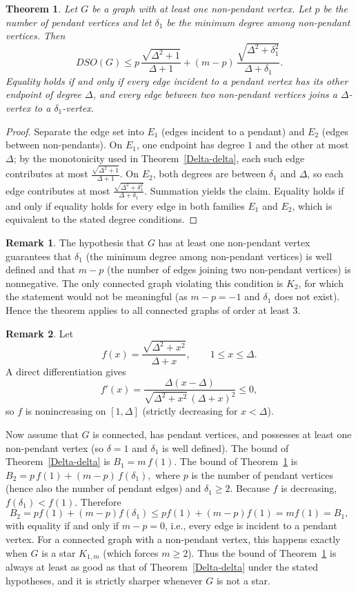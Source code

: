 \documentclass{article}
\newtheorem{theorem}{Theorem}
\theoremstyle{definition}
\newtheorem{remark}{Remark}
\begin{document}
\begin{theorem}\label{new:pendant}
Let $G$ be a graph with at least one non-pendant vertex.
Let $p$ be the number of pendant vertices and let $\delta_1$ be the minimum degree among non-pendant vertices.
Then
\[
DSO(G) \le p\,\frac{\sqrt{\Delta^2+1}}{\Delta+1}
+ (m-p)\,\frac{\sqrt{\Delta^2+\delta_1^2}}{\Delta+\delta_1}.
\]
Equality holds if and only if every edge incident to a pendant vertex has its other endpoint of degree $\Delta$, and every edge between two non-pendant vertices joins a $\Delta$-vertex to a $\delta_1$-vertex.
\end{theorem}
\begin{proof}
Separate the edge set into $E_1$ (edges incident to a pendant) and $E_2$ (edges between non-pendants). On $E_1$, one endpoint has degree $1$ and the other at most $\Delta$; by the monotonicity used in Theorem~\ref{Delta-delta}, each such edge contributes at most $\frac{\sqrt{\Delta^2+1}}{\Delta+1}$. On $E_2$, both degrees are between $\delta_1$ and $\Delta$, so each edge contributes at most $\frac{\sqrt{\Delta^2+\delta_1^2}}{\Delta+\delta_1}$. Summation yields the claim. 
Equality holds if and only if equality holds for every edge in both
families $E_1$ and $E_2$, which is equivalent to the stated degree
conditions.
\end{proof}
\begin{remark}
The hypothesis that $G$ has at least one non-pendant vertex guarantees that $\delta_1$ (the minimum degree among non-pendant vertices) is well defined and that $m-p$ (the number of edges joining two non-pendant vertices) is nonnegative.
The only connected graph violating this condition is $K_2$, for which the statement would not be meaningful (as $m-p=-1$ and $\delta_1$ does not exist).
Hence the theorem applies to all connected graphs of order at least $3$.
\end{remark}
\begin{remark}
Let
\[
f(x)=\frac{\sqrt{\Delta^2+x^2}}{\Delta+x},\qquad 1\le x\le \Delta.
\]
A direct differentiation gives
\[
f'(x)=\frac{\Delta(x-\Delta)}{\sqrt{\Delta^2+x^2}\,(\Delta+x)^2}\le 0,
\]
so $f$ is nonincreasing on $[1,\Delta]$ (strictly decreasing for $x<\Delta$).

Now assume that $G$ is connected, has pendant vertices, and possesses at least one non-pendant vertex (so $\delta=1$ and $\delta_1$ is well defined).
The bound of Theorem~\ref{Delta-delta} is $B_1 = m\,f(1)$.
The bound of Theorem~\ref{new:pendant} is
$
B_2 = p\,f(1)+(m-p)\,f(\delta_1),
$
where $p$ is the number of pendant vertices (hence also the number of pendant edges) and $\delta_1\ge 2$.
Because $f$ is decreasing, $f(\delta_1) < f(1)$.
Therefore
\[
B_2 = p f(1)+(m-p) f(\delta_1) \le p f(1)+(m-p) f(1) = m f(1) = B_1,
\]
with equality if and only if $m-p=0$, i.e., every edge is incident to a pendant vertex.
For a connected graph with a non-pendant vertex, this happens exactly when $G$ is a star $K_{1,m}$ (which forces $m\ge 2$).
Thus the bound of Theorem~\ref{new:pendant} is always at least as good as that of Theorem~\ref{Delta-delta} under the stated hypotheses, and it is strictly sharper whenever $G$ is not a star.
\end{remark}
\end{document}
